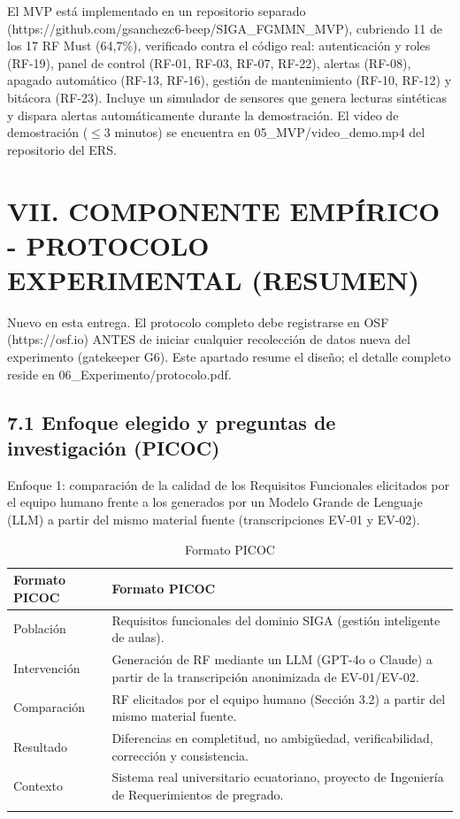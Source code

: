 
El MVP está implementado en un repositorio separado (https://github.com/gsanchezc6-beep/SIGA\_FGMMN\_MVP), cubriendo 11 de los 17 RF Must (64,7\%), verificado contra el código real: autenticación y roles (RF-19), panel de control (RF-01, RF-03, RF-07, RF-22), alertas (RF-08), apagado automático (RF-13, RF-16), gestión de mantenimiento (RF-10, RF-12) y bitácora (RF-23). Incluye un simulador de sensores que genera lecturas sintéticas y dispara alertas automáticamente durante la demostración. El video de demostración ($\leq$3 minutos) se encuentra en 05\_MVP/video\_demo.mp4 del repositorio del ERS.


\section*{VII. COMPONENTE EMPÍRICO - PROTOCOLO EXPERIMENTAL (RESUMEN)}


Nuevo en esta entrega. El protocolo completo debe registrarse en OSF (https://osf.io) ANTES de iniciar cualquier recolección de datos nueva del experimento (gatekeeper G6). Este apartado resume el diseño; el detalle completo reside en 06\_Experimento/protocolo.pdf.


\subsection*{7.1 Enfoque elegido y preguntas de investigación (PICOC)}


Enfoque 1: comparación de la calidad de los Requisitos Funcionales elicitados por el equipo humano frente a los generados por un Modelo Grande de Lenguaje (LLM) a partir del mismo material fuente (transcripciones EV-01 y EV-02).


\begingroup
\small
\begin{longtable}{|p{7.8cm}|p{7.8cm}|}
\hline
Formato PICOC & Formato PICOC \\ \hline
Población & Requisitos funcionales del dominio SIGA (gestión inteligente de aulas). \\ \hline
Intervención & Generación de RF mediante un LLM (GPT-4o o Claude) a partir de la transcripción anonimizada de EV-01/EV-02. \\ \hline
Comparación & RF elicitados por el equipo humano (Sección 3.2) a partir del mismo material fuente. \\ \hline
Resultado & Diferencias en completitud, no ambigüedad, verificabilidad, corrección y consistencia. \\ \hline
Contexto & Sistema real universitario ecuatoriano, proyecto de Ingeniería de Requerimientos de pregrado. \\ \hline
\caption{Formato PICOC}
\end{longtable}
\endgroup

